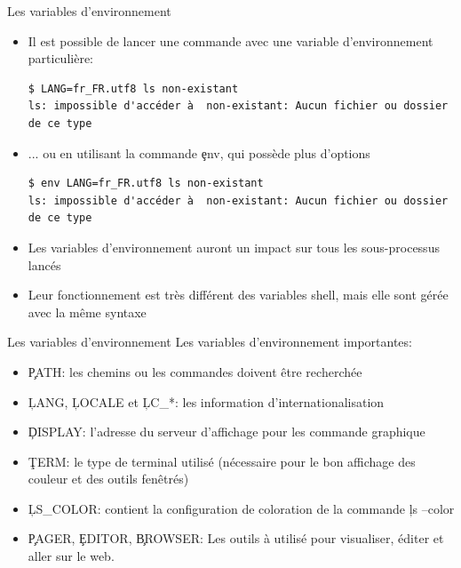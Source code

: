 \begin{frame}[fragile=singleslide]{Les variables d'environnement}
  \begin{itemize}
  \item  Il est  possible de  lancer  une commande  avec une  variable
    d'environnement particulière:
    \begin{lstlisting}
$ LANG=fr_FR.utf8 ls non-existant
ls: impossible d'accéder à  non-existant: Aucun fichier ou dossier de ce type
    \end{lstlisting}
  \item  ... ou  en utilisant  la commande  \c{env}, qui  possède plus
    d'options
    \begin{lstlisting}
$ env LANG=fr_FR.utf8 ls non-existant
ls: impossible d'accéder à  non-existant: Aucun fichier ou dossier de ce type
    \end{lstlisting}
  \item Les  variables d'environnement auront  un impact sur  tous les
    sous-processus lancés
  \item Leur  fonctionnement est  très différent des  variables shell,
    mais elle sont gérée avec la même syntaxe
  \end{itemize}
\end{frame}

\begin{frame}[fragile=singleslide]{Les variables d'environnement}
  Les variables d'environnement importantes:
  \begin{itemize}
  \item \c{PATH}: les chemins ou les commandes doivent être recherchée
  \item   \c{LANG},    \c{LOCALE}   et   \c{LC_*}:    les   information
    d'internationalisation
  \item  \c{DISPLAY}:  l'adresse  du  serveur  d'affichage  pour  les
    commande graphique
  \item \c{TERM}: le type de  terminal utilisé (nécessaire pour le bon
    affichage des couleur et des outils fenêtrés)
  \item \c{LS_COLOR}:  contient la  configuration de coloration  de la
    commande \c{ls --color}
  \item \c{PAGER}, \c{EDITOR}, \c{BROWSER}:  Les outils à utilisé pour
    visualiser, éditer et aller sur le web.
  \end{itemize}
\end{frame}

